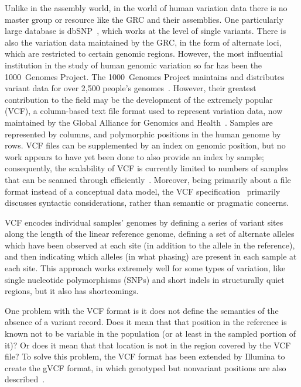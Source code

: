 Unlike in the assembly world, in the world of human variation data there is no master group or resource like the GRC and their assemblies. One particularly large database is dbSNP~\cite{sherry2001dbsnp}, which works at the level of single variants. There is also the variation data maintained by the GRC, in the form of alternate loci, which are restricted to certain genomic regions. However, the most influential institution in the study of human genomic variation so far has been the 1000~Genomes Project. The 1000~Genomes Project maintains and distributes variant data for over 2,500 people's genomes~\cite{sudmant2015integrated}. However, their greatest contribution to the field may be the development of the extremely popular  (VCF), a column-based text file format used to represent variation data, now maintained by the Global Alliance for Genomics and Health~\cite{danecek2011variant}. Samples are represented by columns, and polymorphic positions in the human genome by rows. VCF files can be supplemented by an index on genomic position, but no work appears to have yet been done to also provide an index by sample; consequently, the scalability of VCF is currently limited to numbers of samples that can be scanned through efficiently~\cite{danecek2011variant}. Moreover, being primarily about a file format instead of a conceptual data model, the VCF specification~\cite{marshall2013variant} primarily discusses syntactic considerations, rather than semantic or pragmatic concerns.

VCF encodes individual samples' genomes by defining a series of variant sites along the length of the linear reference genome, defining a set of alternate alleles which have been observed at each site (in addition to the allele in the reference), and then indicating which alleles (in what phasing) are present in each sample at each site. This approach works extremely well for some types of variation, like single nucleotide polymorphisms (SNPs) and short indels in structurally quiet regions, but it also has shortcomings.

One problem with the VCF format is it does not define the semantics of the absence of a variant record. Does it mean that that position in the reference is known not to be variable in the population (or at least in the sampled portion of it)? Or does it mean that that location is not in the region covered by the VCF file? To solve this problem, the VCF format has been extended by Illumina to create the gVCF format, in which genotyped but nonvariant positions are also described~\cite{saunders2014about}.

